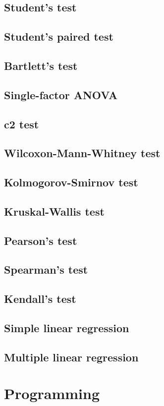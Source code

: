 \documentclass{report}
\begin{document}
	\section{Student’s test}
	\section{Student’s paired test}
	\section{Bartlett’s test}
	\section{Single-factor ANOVA}
	\section{c2 test}
	\section{Wilcoxon-Mann-Whitney test}
	\section{Kolmogorov-Smirnov test}
	\section{Kruskal-Wallis test}
	\section{Pearson’s test}
	\section{Spearman’s test}
	\section{Kendall’s test}
	\section{Simple linear regression}
	\section{Multiple linear regression}

\chapter{Programming}
\end{document}
